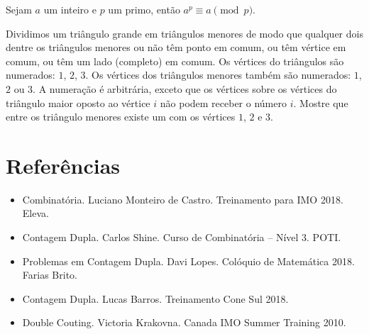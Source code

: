 \documentclass[10pt, a4paper]{article}
\begin{document}
	\begin{prob}
		Sejam $a$ um inteiro e $p$ um primo, então $a^p \equiv a \pmod{p}$.
	\end{prob}

	\begin{prob} %
		Dividimos um triângulo grande em triângulos menores de modo que qualquer dois dentre os triângulos menores ou não têm ponto em comum, ou têm vértice em comum, ou têm um lado (completo) em comum. Os vértices do triângulos são numerados: $1$, $2$, $3$. Os vértices dos triângulos menores também são numerados: $1$, $2$ ou $3$. A numeração é arbitrária, exceto que os vértices sobre os vértices do triângulo maior oposto ao vértice $i$ não podem receber o número $i$. Mostre que entre os triângulo menores existe um com os vértices $1$, $2$ e $3$.
	\end{prob}

	\section{Referências}

	\begin{itemize}
		\item Combinatória. Luciano Monteiro de Castro. Treinamento para IMO 2018. Eleva.
		\item Contagem Dupla. Carlos Shine. Curso de Combinatória -- Nível 3. POTI.
		\item Problemas em Contagem Dupla. Davi Lopes. Colóquio de Matemática 2018. Farias Brito.
		\item Contagem Dupla. Lucas Barros. Treinamento Cone Sul 2018.
		\item Double Couting. Victoria Krakovna. Canada IMO Summer Training 2010.
	\end{itemize}
\end{document}
